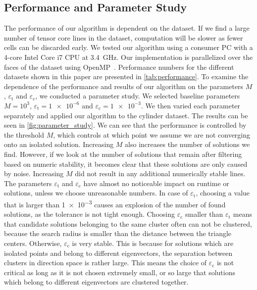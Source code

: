 \subsection{Performance and Parameter Study} %
\label{sub:performance}
%
The performance of our algorithm is dependent on the dataset.
%
If we find a large number of tensor core lines in the dataset, computation
will be slower as fewer cells can be discarded early.
%
We tested our algorithm using a consumer PC with a 4-core Intel Core i7 CPU at
\SI{3.4}{\giga\hertz}.
%
Our implementation is parallelized over the faces of the dataset using
OpenMP~\cite{OMP2013}.
%
Performance numbers for the different datasets shown in this paper are presented
in \autoref{tab:performance}.
%
To examine the dependence of the performance and results of our algorithm on the
parameters $M$, $\varepsilon_{\mathrm{t}}$ and $\varepsilon_{\mathrm{c}}$, we
conducted a parameter study.
%
We selected baseline parameters $M = 10^3$, $\varepsilon_{\mathrm{t}} =
\num{1e-6}$ and $\varepsilon_{\mathrm{c}} = \num{1e-3}$.
%
We then varied each parameter separately and applied our algorithm to the
cylinder dataset.
%
The results can be seen in \autoref{fig:parameter_study}.
%
We can see that the performance is controlled by the threshold $M$, which
controls at which point we assume we are not converging onto an isolated
solution.
%
Increasing $M$ also increases the number of solutions we find.
%
However, if we look at the number of solutions that remain after filtering based
on numeric stability, it becomes clear that these solutions are only caused by
noise.
%
Increasing $M$ did not result in any additional numerically stable lines.
%
The parameters $\varepsilon_{\mathrm{t}}$ and $\varepsilon_{\mathrm{c}}$ have
almost no noticeable impact on runtime or solutions, unless we choose
unreasonable numbers.
%
In case of $\varepsilon_{\mathrm{t}}$, choosing a value that is larger than
\num{1e-3} causes an explosion of the number of found solutions, as the
tolerance is not tight enough.
%
Choosing $\varepsilon_{\mathrm{c}}$ smaller than $\varepsilon_{\mathrm{t}}$
means that candidate solutions belonging to the same cluster often can not be
clustered, because the search radius is smaller than the distance between the
triangle centers.
%
Otherwise, $\varepsilon_{\mathrm{c}}$ is very stable.
%
This is because for solutions which are isolated points and belong to different
eigenvectors, the separation between clusters in direction space is rather
large.
This means the choice of $\varepsilon_{\mathrm{c}}$ is not critical as
long as it is not chosen extremely small, or so large that solutions
which belong to different eigenvectors are clustered together.

